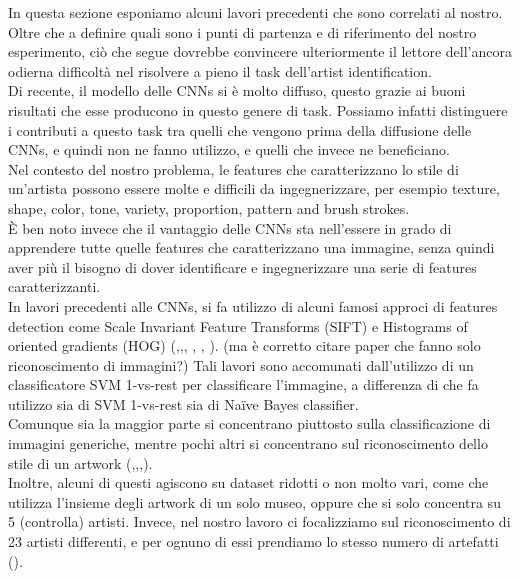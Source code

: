 \documentclass{article}
\begin{document}
In questa sezione esponiamo alcuni lavori precedenti che sono correlati al nostro. Oltre che a definire quali sono i punti di partenza e di riferimento del nostro esperimento, ciò che segue dovrebbe convincere ulteriormente il lettore dell'ancora odierna difficoltà nel risolvere a pieno il task dell'artist identification.\\
Di recente, il modello delle CNNs si è molto diffuso, questo grazie ai buoni risultati che esse producono in questo genere di task. Possiamo infatti distinguere i contributi a questo task tra quelli che vengono prima della diffusione delle CNNs, e quindi non ne fanno utilizzo, e quelli che invece ne beneficiano.\\
Nel contesto del nostro problema, le features che caratterizzano lo stile di un'artista possono essere molte e difficili da ingegnerizzare, per esempio texture, shape, color, tone, variety, proportion,  pattern and brush strokes.\\
È ben noto invece che il vantaggio delle CNNs sta nell'essere in grado di apprendere tutte quelle features che caratterizzano una immagine, senza quindi aver più il bisogno di dover identificare e ingegnerizzare una serie di features caratterizzanti.\\
In lavori precedenti alle CNNs, si fa utilizzo di alcuni famosi approci di features detection come Scale Invariant Feature Transforms (SIFT) e Histograms of oriented gradients (HOG) (\cite{mensink2014},\cite{lowe04},\cite{lombardi05}, \cite{lazebnik06}, \cite{bosch08}, \cite{jou2011}). (ma è corretto citare paper che fanno solo riconoscimento di immagini?) Tali lavori sono accomunati dall'utilizzo di un classificatore SVM 1-vs-rest per classificare l'immagine, a differenza di \cite{jou2011} che fa utilizzo sia di SVM 1-vs-rest sia di Naïve Bayes classifier.\\ Comunque sia la maggior parte si concentrano piuttosto sulla classificazione di immagini generiche, mentre pochi altri si concentrano sul riconoscimento dello stile di un artwork (\cite{mensink2014},\cite{lombardi05},\cite{jou2011},\cite{Saleh2015}).\\
Inoltre, alcuni di questi agiscono su dataset ridotti o non molto vari, come \cite{mensink2014} che utilizza l'insieme degli artwork di un solo museo, oppure \cite{jou2011} che si solo concentra su 5 (controlla) artisti. Invece, nel nostro lavoro ci focalizziamo sul riconoscimento di 23 artisti differenti, e per ognuno di essi prendiamo lo stesso numero di artefatti (\cite{ArtGANDataset}). 
\end{document}
